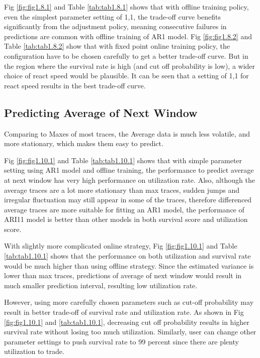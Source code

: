 \documentclass{article}
\begin{document}
\begin{flushleft}
Fig \ref{fig:fig1.8.1} and Table \ref{tab:tab1.8.1} shows that with offline training policy, even the simplest parameter setting of 1,1, the trade-off curve benefits significantly from the adjustment policy, meaning consecutive failures in predictions are common with offline training of AR1 model. Fig \ref{fig:fig1.8.2} and Table \ref{tab:tab1.8.2} show that with fixed point online training policy, the configuration have to be chosen carefully to get a better trade-off curve. But in the region where the survival rate is high (and cut off probability is low), a wider choice of react speed would be plausible. It can be seen that a setting of 1,1 for react speed results in the best trade-off curve.
\end{flushleft}

\subsection{Predicting Average of Next Window}

\begin{flushleft}
Comparing to Maxes of most traces, the Average data is much less volatile, and more stationary, which makes them easy to predict.

Fig \ref{fig:fig1.10.1} and Table \ref{tab:tab1.10.1} shows that with simple parameter setting using AR1 model and offline training, the performance to predict average at next window has very high performance on utilization rate. Also, although the average traces are a lot more stationary than max traces, sudden jumps and irregular fluctuation may still appear in some of the traces, therefore differenced average traces are more suitable for fitting an AR1 model, the performance of ARI11 model is better than other models in both survival score and utilization score.

With slightly more complicated online strategy, Fig \ref{fig:fig1.10.1} and Table \ref{tab:tab1.10.1} shows that the performance on both utilization and survival rate would be much higher than using offline strategy. Since the estimated variance is lower than max traces, predictions of average of next window would result in much smaller prediction interval, resulting low utilization rate.

However, using more carefully chosen parameters such as cut-off probability may result in better trade-off of survival rate and utilization rate. As shown in Fig \ref{fig:fig1.10.1} and \ref{tab:tab1.10.1}, decreasing cut off probability results in higher survival rate without losing too much utilization. Similarly, user can change other parameter settings to push survival rate to 99 percent since there are plenty utilization to trade.
\end{flushleft}
\end{document}
